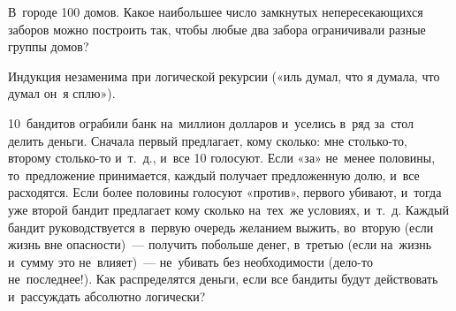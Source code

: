 \begin{problems}

\item
В~городе 100 домов.
Какое наибольшее число замкнутых непересекающихся заборов можно построить так,
чтобы любые два забора ограничивали разные группы домов?

\end{problems}

Индукция незаменима при логической рекурсии
(«иль думал, что я думала, что думал он~я сплю»).

\begin{problems}

\item
10~бандитов ограбили банк на~миллион долларов и~уселись в~ряд за~стол делить
деньги.
Сначала первый предлагает, кому сколько: мне столько-то, второму столько-то
и~т.~д., и~все 10 голосуют.
Если «за» не~менее половины, то~предложение принимается, каждый получает
предложенную долю, и~все расходятся.
Если более половины голосуют «против», первого убивают, и~тогда уже второй
бандит предлагает кому сколько на~тех~же условиях, и~т.~д.
Каждый бандит руководствуется в~первую очередь желанием выжить, во~вторую
(если жизнь вне опасности)~— получить побольше денег, в~третью
(если на~жизнь и~сумму это не~влияет)~— не~убивать без необходимости
(дело-то не~последнее!).
Как распределятся деньги, если все бандиты будут действовать и~рассуждать
абсолютно логически?

\end{problems}

